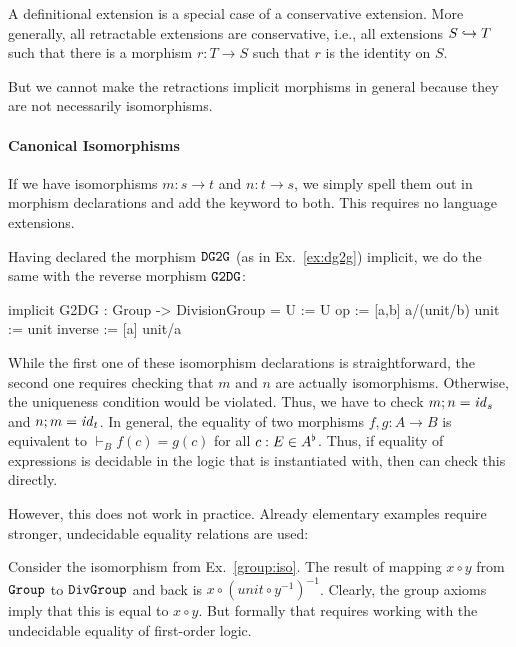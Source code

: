\begin{remark}
A definitional extension is a special case of a conservative extension.
More generally, all retractable extensions are conservative, i.e., all extensions $S\hookrightarrow T$ such that there is a morphism $r:T\to S$ such that $r$ is the identity on $S$.

But we cannot make the retractions implicit morphisms in general because they are not necessarily isomorphisms.
\end{remark}

\paragraph{Canonical Isomorphisms}
If we have isomorphisms $m:s\to t$ and $n:t\to s$, we simply spell them out in morphism declarations and add the keyword  to both.
This requires no language extensions.

\begin{example}\label{group:iso}
Having declared the morphism $\operatorname{\mathtt{DG2G}}$ (as in Ex.~\ref{ex:dg2g}) implicit, we do the same with the reverse morphism  $\operatorname{\mathtt{G2DG}}$:
\begin{mmtcode}
implicit G2DG : Group -> DivisionGroup =
  U := U
  op := [a,b] a/(unit/b) 
  unit := unit
  inverse := [a] unit/a
\end{mmtcode}
\end{example}

While the first one of these isomorphism declarations is straightforward, the second one requires checking that $m$ and $n$ are actually isomorphisms.
Otherwise, the uniqueness condition would be violated.
Thus, we have to check $m;n=\mathit{id}_{s}$ and $n;m=\mathit{id}_{t}$.
In general, the equality of two morphisms $f,g:A\to B$ is equivalent to $\vdash_B f(c)=g(c)$ for all $c:E\in A^\flat$.
Thus, if equality of expressions is decidable in the logic that \mmt is instantiated with, then \mmt can check this directly.

However, this does not work in practice.
Already elementary examples require stronger, undecidable equality relations are used:

\begin{example}
Consider the isomorphism from Ex.~\ref{group:iso}.
The result of mapping $x\circ y$ from $\operatorname{\mathtt{Group}}$ to $\operatorname{\mathtt{DivGroup}}$ and back is $x\circ(unit\circ y^{-1})^{-1}$.
Clearly, the group axioms imply that this is equal to $x\circ y$.
But formally that requires working with the undecidable equality of first-order logic.
\end{example}

